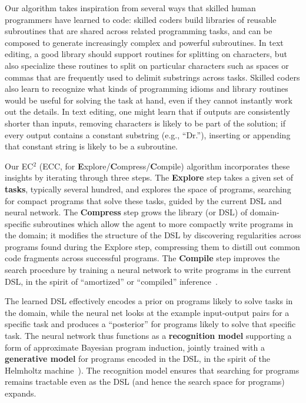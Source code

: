 \documentclass{article}
\newcommand{\system}{\textsc{EC$^2$} }
\begin{document}
Our algorithm takes inspiration from several ways that skilled human
programmers have learned to code: skilled coders build libraries of
reusable subroutines that are shared across related programming tasks,
and can be composed to generate increasingly complex and powerful
subroutines.  In text editing, a good library should support routines
for splitting on characters, but also specialize these routines to
split on particular characters such as spaces or commas that are
frequently used to delimit substrings across tasks.  Skilled coders
also learn to recognize what kinds of programming idioms and library
routines would be useful for solving the task at hand, even if they
cannot instantly work out the details.  In text editing, one might
learn that if outputs are consistently shorter than inputs, removing
characters is likely to be part of the solution; if every output
contains a constant substring (e.g., ``Dr.''), inserting or appending
that constant string is likely to be a subroutine.

Our \system (ECC, for \textbf{E}xplore/\textbf{C}ompress/\textbf{C}ompile)
algorithm incorporates these insights by iterating through three steps. 
The \textbf{Explore} step takes a given set of \textbf{tasks}, typically
several hundred, and explores the space of programs, searching for compact programs that solve these tasks,
guided by the current DSL and neural network.
The \textbf{Compress} step grows the library (or DSL) of
domain-specific subroutines which allow the agent to more compactly
write programs in the domain; it modifies the structure of the DSL by
discovering regularities across programs found during the Explore step, compressing
them to distill out common code fragments across successful programs.
The \textbf{Compile} step improves the search procedure by training a neural network to
write programs in the current DSL, in the spirit of ``amortized'' or
``compiled'' inference~\cite{le2016inference,stuhlmuller2013learning}.%

The learned DSL effectively encodes a prior on programs likely to
solve tasks in the domain, while the neural net looks at the example
input-output pairs for a specific task and produces a ``posterior''
for programs likely to solve that specific task.  The neural network
thus functions as a \textbf{recognition model} supporting a form of
approximate Bayesian program induction, jointly trained with a
\textbf{generative model} for programs encoded in the DSL, in the
spirit of the Helmholtz machine~\cite{hinton1995wake}). The
recognition model ensures that searching for programs remains
tractable even as the DSL (and hence the search space for programs)
expands.
\end{document}
